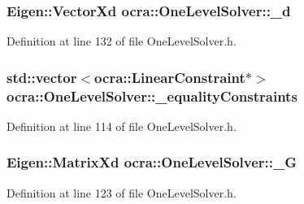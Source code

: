 \subsubsection[{\texorpdfstring{\+\_\+d}{_d}}]{\setlength{\rightskip}{0pt plus 5cm}Eigen\+::\+Vector\+Xd ocra\+::\+One\+Level\+Solver\+::\+\_\+d\hspace{0.3cm}{\ttfamily [protected]}}\hypertarget{classocra_1_1OneLevelSolver_a5fe79bb9685753a4db27e99f6b780832}{}\label{classocra_1_1OneLevelSolver_a5fe79bb9685753a4db27e99f6b780832}


Definition at line 132 of file One\+Level\+Solver.\+h.

\subsubsection[{\texorpdfstring{\+\_\+equality\+Constraints}{_equalityConstraints}}]{\setlength{\rightskip}{0pt plus 5cm}std\+::vector$<${\bf ocra\+::\+Linear\+Constraint}$\ast$$>$ ocra\+::\+One\+Level\+Solver\+::\+\_\+equality\+Constraints\hspace{0.3cm}{\ttfamily [protected]}}\hypertarget{classocra_1_1OneLevelSolver_a482b16a5c6e8a17c62b0a55a006f9c91}{}\label{classocra_1_1OneLevelSolver_a482b16a5c6e8a17c62b0a55a006f9c91}


Definition at line 114 of file One\+Level\+Solver.\+h.

\subsubsection[{\texorpdfstring{\+\_\+G}{_G}}]{\setlength{\rightskip}{0pt plus 5cm}Eigen\+::\+Matrix\+Xd ocra\+::\+One\+Level\+Solver\+::\+\_\+G\hspace{0.3cm}{\ttfamily [protected]}}\hypertarget{classocra_1_1OneLevelSolver_a01deacde23d6655fee88be9977636a5a}{}\label{classocra_1_1OneLevelSolver_a01deacde23d6655fee88be9977636a5a}


Definition at line 123 of file One\+Level\+Solver.\+h.

